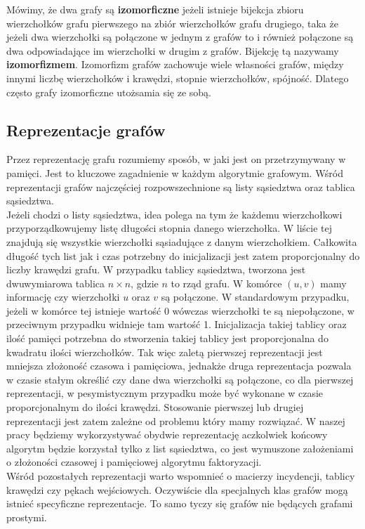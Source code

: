 \documentclass[12pt,a4paper,titlepage]{article}
\newcommand\tab[1][1cm]{\hspace*{#1}}
\begin{document}
Mówimy, że dwa grafy są \textbf{izomorficzne} jeżeli istnieje bijekcja zbioru wierzchołków grafu pierwszego na zbiór wierzchołków grafu drugiego, taka że jeżeli dwa wierzchołki są połączone w jednym z grafów to i również połączone są dwa odpowiadające im wierzchołki w drugim z grafów. Bijekcję tą nazywamy \textbf{izomorfizmem}. Izomorfizm grafów zachowuje wiele własności grafów, między innymi liczbę wierzchołków i krawędzi, stopnie wierzchołków, spójność. Dlatego często grafy izomorficzne utożsamia się ze sobą.\\
\subsection{Reprezentacje grafów}
Przez reprezentację grafu rozumiemy sposób, w jaki jest on przetrzymywany w pamięci. Jest to kluczowe zagadnienie w każdym algorytmie grafowym. Wśród reprezentacji grafów najczęściej rozpowszechnione są listy sąsiedztwa oraz tablica sąsiedztwa.\\
\tab[0.6cm]Jeżeli chodzi o listy sąsiedztwa, idea polega na tym że każdemu wierzchołkowi przyporządkowujemy listę długości stopnia danego wierzchołka. W liście tej znajdują się wszystkie wierzchołki sąsiadujące z danym wierzchołkiem. Całkowita długość tych list jak i czas potrzebny do inicjalizacji jest zatem proporcjonalny do liczby krawędzi grafu. W przypadku tablicy sąsiedztwa, tworzona jest dwuwymiarowa tablica $n \times n$, gdzie $n$ to rząd grafu. W komórce $(u,v)$ mamy informację czy wierzchołki $u$ oraz $v$ są połączone. W standardowym przypadku, jeżeli w komórce tej istnieje wartość 0 wówczas wierzchołki te są niepołączone, w przeciwnym przypadku widnieje tam wartość 1. Inicjalizacja takiej tablicy oraz ilość pamięci potrzebna do stworzenia takiej tablicy jest proporcjonalna do kwadratu ilości wierzchołków. Tak więc zaletą pierwszej reprezentacji jest mniejsza złożoność czasowa i pamięciowa, jednakże druga reprezentacja pozwala w czasie stałym określić czy dane dwa wierzchołki są połączone, co dla pierwszej reprezentacji, w pesymistycznym przypadku może być wykonane w czasie proporcjonalnym do ilości krawędzi. Stosowanie pierwszej lub drugiej reprezentacji jest zatem zależne od problemu który mamy rozwiązać. W naszej pracy będziemy wykorzystywać obydwie reprezentację aczkolwiek końcowy algorytm będzie korzystał tylko z list sąsiedztwa, co jest wymuszone założeniami o złożoności czasowej i pamięciowej algorytmu faktoryzacji.\\
\tab[0.6cm]Wśród pozostałych reprezentacji warto wspomnieć o macierzy incydencji, tablicy krawędzi czy pękach wejściowych. Oczywiście dla specjalnych klas grafów mogą istnieć specyficzne reprezentacje. To samo tyczy się grafów nie będących grafami prostymi.
\end{document}
